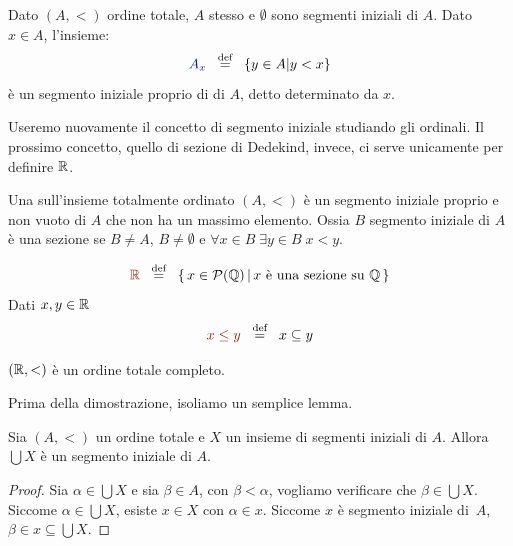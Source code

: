 \begin{example}
	Dato $(A,<)$ ordine totale, $A$ stesso e $\emptyset$ sono segmenti iniziali di $A$. Dato $x \in A$, l'insieme:
	\[ {\drkblu A_x}  \;\;\Mydef\;\; \{y \in A | y < x\}
		\]
	\`e un segmento iniziale proprio di di $A$, detto  determinato da $x$.
\end{example}

\begin{note}
	Useremo nuovamente il concetto di segmento iniziale studiando gli ordinali. Il prossimo concetto, quello di sezione di Dedekind, invece, ci serve unicamente per definire $\RR$.
\end{note}

\begin{definition}
	Una  sull'insieme totalmente ordinato $(A,<)$ \`e
un segmento iniziale {\drkred proprio}
	e {\drkred non vuoto} di $A$ che {\drkred non ha un massimo
elemento.}
{\drkgrn Ossia $B$ segmento iniziale di $A$ \`e una sezione se $B \ne A$,
$B \ne \emptyset$ e $\forall {x \in B} \; \exists {y \in B} \; x < y$.}
\end{definition}

\begin{definition}
	\[ {\drkred \RR} \;\;\Mydef\;\; \{\,x \in \ps(\QQ)\, | \,
\text{$x$ \`e una sezione su $\QQ$}\,\}
		\]
	Dati $x,y\in\mathbb R$
	\[ {\drkred x \leq y} \;\;\Mydef\;\; x \subseteq y
		\]
\end{definition}

\begin{proposition}[$\RR$ \`e completo]\label{prop-r-comp}
	$(\mathbb R,<)$ \`e un ordine totale completo.
\end{proposition}

Prima della dimostrazione, isoliamo un semplice lemma.

\begin{lemma}
	Sia $(A,<)$ un ordine totale e $X$ un insieme di segmenti iniziali di $A$. Allora $\bigcup X$ \`e un segmento iniziale di $A$.
\end{lemma}

\begin{proof}
	Sia $\alpha \in \bigcup X$ e sia $\beta \in A$, con $\beta < \alpha$, vogliamo verificare che $\beta \in \bigcup X$.
	Siccome $\alpha \in \bigcup X$, esiste $x\in X$ con $\alpha \in
x$. Siccome $x$ \`e segmento iniziale di~$A$, $\beta \in x \subseteq \bigcup X$.
\end{proof}

